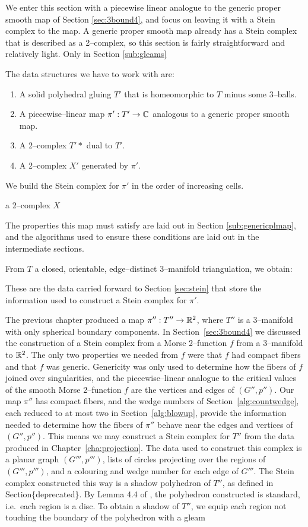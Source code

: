 We enter this section with a piecewise linear analogue to the generic proper smooth map of Section \ref{sec:3bound4}, and focus on leaving it with a Stein complex to the map.
A generic proper smooth map already has a Stein complex that is described as a 2--complex, so this section is fairly straightforward and relatively light.
Only in Section \ref{sub:gleams}

The data structures we have to work with are:
\begin{enumerate}
	\item A solid polyhedral gluing $T'$ that is homeomorphic to $T$ minus some 3--balls.
	\item A piecewise--linear map $\pi':T'\to\mathbb{C}$ analogous to a generic proper smooth map.
	\item A 2--complex $T'*$ dual to $T'$.
	\item A 2--complex $X'$ generated by $\pi'$.
\end{enumerate}
We build the Stein complex for $\pi'$ in the order of increasing cells.

a 2--complex $X$

The properties this map must satisfy are laid out in Section \ref{sub:genericplmap}, and the algorithms used to ensure these conditions are laid out in the intermediate sections.

From $T$ a closed, orientable, edge--distinct 3--manifold triangulation, we obtain:

These are the data carried forward to Section \ref{sec:stein} that store the information used to construct a Stein complex for $\pi'$.




The previous chapter produced a map $\pi'':T''\to \mathbb{R}^2$, where $T''$ is a 3--manifold with only spherical boundary components.
In Section~\ref{sec:3bound4} we discussed the construction of a Stein complex from a Morse 2--function $f$ from a 3--manifold to $\mathbb{R}^2$.
The only two properties we needed from $f$ were that $f$ had compact fibers and that $f$ was generic.
Genericity was only used to determine how the fibers of $f$ joined over singularities, and the piecewise--linear analogue to the critical values of the smooth Morse 2--function $f$ are the vertices and edges of $(G'',p'')$.
Our map $\pi''$ has compact fibers, and the wedge numbers of Section~\ref{alg:countwedge}, each reduced to at most two in Section~\ref{alg:blowup}, provide the information needed to determine how the fibers of $\pi''$ behave near the edges and vertices of $(G'',p'')$.
This means we may construct a Stein complex for $T''$ from the data produced in Chapter~\ref{cha:projection}.
The data used to construct this complex is a planar graph $(G''',p''')$, lists of circles projecting over the regions of $(G''',p''')$, and a colouring and wedge number for each edge of $G'''$.
The Stein complex constructed this way is a shadow polyhedron of $T''$, as defined in Section\{deprecated\}.
By Lemma 4.4 of \cite{CostThur08}, the polyhedron constructed is standard, i.e.\ each region is a disc.
To obtain a shadow of $T''$, we equip each region not touching the boundary of the polyhedron with a gleam
